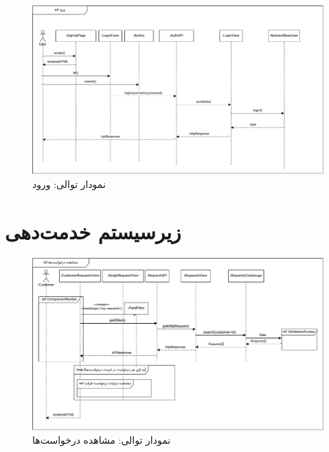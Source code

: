 \eject \pdfpagewidth=11in \pdfpageheight=7in
\begin{figure}[ht!]
	\centering
	\includegraphics[scale=0.8]{figs/design-sequence/3-2.pdf}
	\caption{نمودار توالی: ورود}
\end{figure}
\FloatBarrier
\newpage

\section{زیرسیستم خدمت‌دهی}

\eject \pdfpagewidth=11in \pdfpageheight=7in

\begin{figure}[ht!]
	\centering
	\includegraphics[scale=0.8]{figs/design-sequence/3-10.pdf}
	\caption{نمودار توالی: مشاهده درخواست‌ها}
\end{figure}
\FloatBarrier
\newpage

\eject \pdfpagewidth=10in \pdfpageheight=10in

